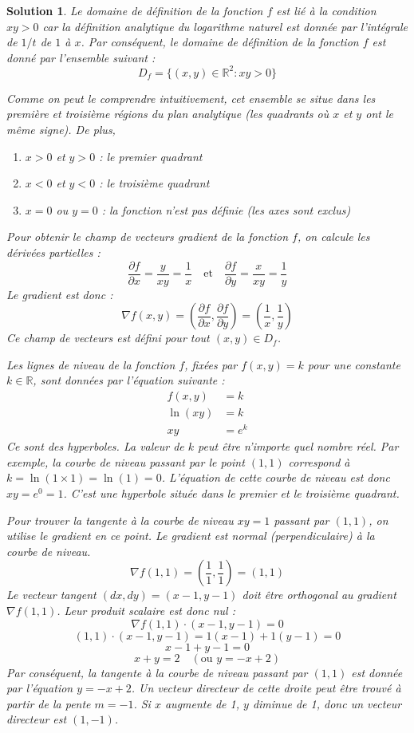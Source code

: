\documentclass[10pt]{article}
\theoremstyle{frenchstyle}
\newtheorem{solution}{Solution}
\begin{document}
\begin{solution}

	Le domaine de définition de la fonction $f$ est lié à la condition $xy > 0$ car la définition analytique du logarithme naturel est donnée par l'intégrale de $1/t$ de $1$ à $x$. Par conséquent, le domaine de définition de la fonction $f$ est donné par l'ensemble suivant :
	\[
		D_f = \{(x, y) \in \mathbb{R}^2 : xy > 0\}
	\]

	Comme on peut le comprendre intuitivement, cet ensemble se situe dans les première et troisième régions du plan analytique (les quadrants où $x$ et $y$ ont le même signe). De plus,
	\begin{enumerate}
		\item $x > 0$ et $y > 0$ : le premier quadrant
		\item $x < 0$ et $y < 0$ : le troisième quadrant
		\item $x = 0$ ou $y = 0$ : la fonction n'est pas définie (les axes sont exclus)
	\end{enumerate}

	Pour obtenir le champ de vecteurs gradient de la fonction $f$, on calcule les dérivées partielles :
	\[
		\frac{\partial f}{\partial x} = \frac{y}{xy} = \frac{1}{x} \quad \text{et} \quad \frac{\partial f}{\partial y} = \frac{x}{xy} = \frac{1}{y}
	\]
	Le gradient est donc :
	\[
		\nabla f(x,y) = \left( \frac{\partial f}{\partial x}, \frac{\partial f}{\partial y} \right) = \left( \frac{1}{x}, \frac{1}{y} \right)
	\]
	Ce champ de vecteurs est défini pour tout $(x, y) \in D_f$.

	Les lignes de niveau de la fonction $f$, fixées par $f(x,y) = k$ pour une constante $k \in \mathbb{R}$, sont données par l'équation suivante :
	\begin{align*}
		f(x,y)  & = k   \\
		\ln(xy) & = k   \\
		xy      & = e^k
	\end{align*}
	Ce sont des hyperboles. La valeur de $k$ peut être n'importe quel nombre réel. Par exemple, la courbe de niveau passant par le point $(1, 1)$ correspond à $k = \ln(1 \times 1) = \ln(1) = 0$. L'équation de cette courbe de niveau est donc $xy = e^0 = 1$. C'est une hyperbole située dans le premier et le troisième quadrant.

	Pour trouver la tangente à la courbe de niveau $xy=1$ passant par $(1, 1)$, on utilise le gradient en ce point. Le gradient est normal (perpendiculaire) à la courbe de niveau.
	\[
		\nabla f(1,1) = \left( \frac{1}{1}, \frac{1}{1} \right) = (1,1)
	\]
	Le vecteur tangent $(dx, dy) = (x-1, y-1)$ doit être orthogonal au gradient $\nabla f(1,1)$. Leur produit scalaire est donc nul :
	\[
		\nabla f(1,1) \cdot (x-1, y-1) = 0
	\]
	\[
		(1, 1) \cdot (x-1, y-1) = 1(x-1) + 1(y-1) = 0
	\]
	\[
		x - 1 + y - 1 = 0
	\]
	\[
		x + y = 2 \quad (\text{ou } y = -x + 2)
	\]
	Par conséquent, la tangente à la courbe de niveau passant par $(1, 1)$ est donnée par l'équation $y = -x + 2$. Un vecteur directeur de cette droite peut être trouvé à partir de la pente $m=-1$. Si $x$ augmente de 1, $y$ diminue de 1, donc un vecteur directeur est $(1, -1)$.


\end{solution}
\end{document}
